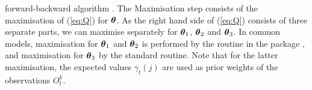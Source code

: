 \documentclass[article]{jss}
\newcommand{\mat}{\mathbf}
\newcommand{\greekv}[1]{\mbox{\boldmath$\mathrm{#1}$}}
\begin{document}
forward-backward algorithm \citep[see e.g.,][]{Rabiner1989}. The Maximisation 
step consists of the maximisation of (\ref{eq:Q}) for $\greekv{\theta}$. As the 
right hand side of (\ref{eq:Q}) consists of three separate parts, we can 
maximise separately for $\greekv{\theta}_1$, $\greekv{\theta}_2$ and 
$\greekv{\theta}_3$. In common models, maximisation for $\greekv{\theta}_1$ and 
$\greekv{\theta}_2$ is performed by the  routine in the 
 package \citep{Venables2002}, and maximisation for 
$\greekv{\theta}_3$ by the standard  routine. Note that for the latter 
maximisation, the expected values $\gamma_t(j)$ are used as prior weights of the 
observations $O^k_t$.




\end{document}
